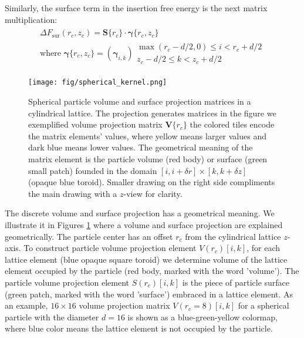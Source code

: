 \documentclass[10pt, a4paper]{article}
\begin{document}
\begin{multicols}{2}
Similarly, the surface term in the insertion free energy is the next matrix multiplication:
\begin{eqnarray}
    \begin{split}
        \Delta F_{\textrm{sur}}(r_c, z_c) = \bm{S}\{r_c\} \cdot \bm{\gamma}\{r_c, z_c\} \\[5pt]
        \text{where } \bm{\gamma}\{r_c,z_c\} =\left(\bm{\gamma}_{i,k}\right) {\substack{\max(r_c-d/2,0) \le i < r_c+d/2 \\ z_c-d/2 \le k < z_c+d/2}}
    \end{split}
\end{eqnarray}


\begin{figure}[H]
    \centering
    \texttt{[image: fig/spherical\_kernel.png]}
    \caption{
        Spherical particle volume and surface projection matrices in a cylindrical lattice.
        The projection generates matrices in the figure we exemplified volume projection matrix $\bm{V}\{r_c\}$ the colored tiles encode the matrix elements' values, where yellow means larger values and dark blue means lower values.
        The geometrical meaning of the matrix element is the particle volume (red body) or surface (green small patch) founded in the domain $[i, i+\delta r] \times [k, k +\delta z]$ (opaque blue toroid).
        Smaller drawing on the right side compliments the main drawing with a $z$-view for clarity.
    }
    \label{fig:spherical_kernel}
\end{figure}

The discrete volume and surface projection has a geometrical meaning.
We illustrate it in Figures \ref{fig:spherical_kernel} where a volume and surface projection are explained geometrically.
The particle center has an offset $r_c$ from the cylindrical lattice $z$-axis.
To construct particle volume projection element $V(r_c)[i,k]$, for each lattice element (blue opaque square toroid) we determine volume of the lattice element occupied by the particle (red body, marked with the word 'volume').
The particle volume projection element $S(r_c)[i,k]$ is the piece of particle surface (green patch, marked with the word 'surface') embraced in a lattice element.
As an example, $16 \times 16$ volume projection matrix $V(r_c = 8)[i,k]$ for a spherical particle with the diameter $d=16$ is shown as a blue-green-yellow colormap, where blue color means the lattice element is not occupied by the particle.




    
\end{multicols}
\end{document}
